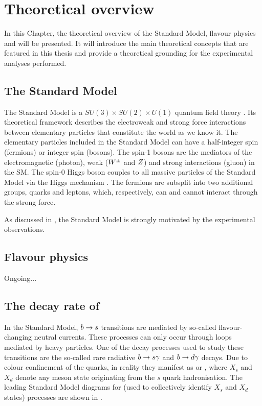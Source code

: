 \chapter{Theoretical overview}\label{ch:theory}

In this Chapter, the theoretical overview of the Standard Model, flavour physics and \BtoXsgamma will be presented.
It will introduce the main theoretical concepts that are featured in this thesis and provide 
a theoretical grounding for the experimental analyses performed.

\section{The Standard Model}

The Standard Model is a $SU(3)\times SU(2)\times U(1)$ quantum field theory \cite{Peskin:1995ev}.
Its theoretical framework describes the electroweak and strong force interactions between elementary particles that constitute the world as we know it.
The elementary particles included in the Standard Model can have a half-integer spin (fermions) or integer spin (bosons).
The spin-1 bosons are the mediators of the electromagnetic (photon), weak ($W^\pm$ and $Z$) and strong interactions (gluon) in the SM.
The spin-0 Higgs boson couples to all massive particles of the Standard Model via the Higgs mechanism \cite{PhysRevLett.13.508}.
The fermions are subsplit into two additional groups, quarks and leptons, which, respectively, can and cannot interact through the strong force.

As discussed in , the Standard Model is strongly motivated by the experimental observations.

\section{Flavour physics}

Ongoing...

\section{The decay rate of \texorpdfstring{\BtoXsdgamma}{B->Xsg}}\label{sec:btosgamma_totalrate_theory}

In the Standard Model, $b\rightarrow s$ transitions are mediated by so-called flavour-changing neutral currents.
These processes can only occur through loops mediated by heavy particles.
One of the decay processes used to study these transitions are the so-called rare radiative $b\rightarrow s\gamma$ and $b\rightarrow d\gamma$ decays.
Due to colour confinement of the quarks, in reality they manifest as \BtoXsgamma or \BtoXdgamma, where $X_s$ and $X_d$ denote any meson state originating from the $s$ quark hadronisation.
The leading Standard Model diagrams for \BtoXsdgamma (used to collectively identify $X_s$ and $X_d$ states) processes are shown in .

